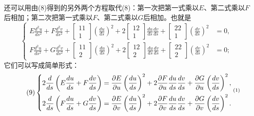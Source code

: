 还可以用由(8)得到的另外两个方程取代(8)：第一次把第一式乘以\(E\)、第二式乘以\(F\)后相加；第二次把第一式乘以\(F\)、第二式乘以\(G\)后相加。也就是
\[
\left\{\begin{aligned}
 E\frac{d^2u}{ds^2}+F\frac{d^2v}{ds^2}+\begin{bmatrix}11\\1\end{bmatrix}\left(\frac{du}{ds}\right)^2+2\begin{bmatrix}12\\1\end{bmatrix}\frac{du}{ds}\frac{dv}{ds}+\begin{bmatrix}22\\1\end{bmatrix}\left(\frac{dv}{ds}\right)^2&=0,\\
 F\frac{d^2u}{ds^2}+G\frac{d^2v}{ds^2}+\begin{bmatrix}11\\2\end{bmatrix}\left(\frac{du}{ds}\right)^2+2\begin{bmatrix}12\\2\end{bmatrix}\frac{du}{ds}\frac{dv}{ds}+\begin{bmatrix}22\\2\end{bmatrix}\left(\frac{dv}{ds}\right)^2&=0;
\end{aligned}\right.
\]
它们可以写成简单形式：
\begin{equation}\tag{9}
\left\{\begin{aligned}
 2\frac d{ds}\left(E\frac{du}{ds}+F\frac{dv}{ds}\right)&=\frac{\partial E}{\partial u}\left(\frac{du}{ds}\right)^2+2\frac{\partial F}{\partial u}\frac{du}{ds}\frac{dv}{ds}+\frac{\partial G}{\partial u}\left(\frac{dv}{ds}\right)^2,\\
 2\frac d{ds}\left(F\frac{du}{ds}+G\frac{dv}{ds}\right)&=\frac{\partial E}{\partial v}\left(\frac{du}{ds}\right)^2+2\frac{\partial F}{\partial v}\frac{du}{ds}\frac{dv}{ds}+\frac{\partial G}{\partial v}\left(\frac{dv}{ds}\right)^2.
\end{aligned}\right.\srcfnmark{1}
\end{equation}

